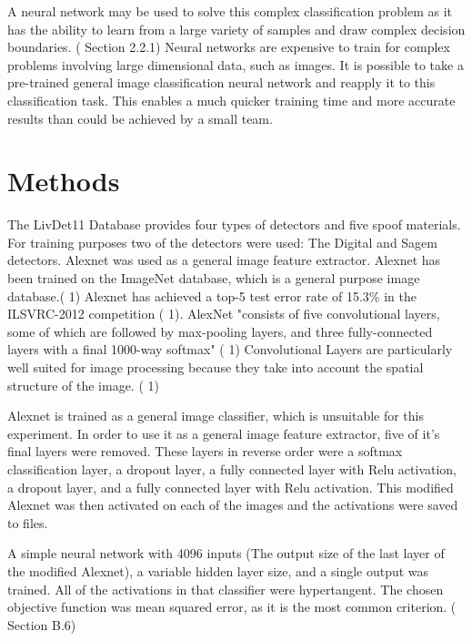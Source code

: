 \documentclass[]{article}
\begin{document}
A neural network may be used to solve this complex classification problem as it has the ability to learn from a large variety of samples and draw complex decision boundaries. (\cite{book} Section 2.2.1)  Neural networks are expensive to train for complex problems involving large dimensional data, such as images. It is possible to take a pre-trained general image classification neural network and reapply it to this classification task. This enables a much quicker training time and more accurate results than could be achieved by a small team. 

\section{Methods}
The LivDet11 Database provides four types of detectors and five spoof materials. For training purposes two of the detectors were used: The Digital and Sagem detectors. Alexnet was used as a general image feature extractor. Alexnet has been trained on the ImageNet database, which is a general purpose image database.(\cite{alexnet} 1) Alexnet has achieved a  top-5 test error rate of 15.3\% in the ILSVRC-2012 competition (\cite{alexnet} 1). AlexNet "consists
of five convolutional layers, some of which are followed by max-pooling layers,
and three fully-connected layers with a final 1000-way softmax" (\cite{alexnet} 1) Convolutional Layers are particularly well suited for image processing because they take into account the spatial structure of the image. (\cite{convnets} 1)

Alexnet is trained as a general image classifier, which is unsuitable for this experiment.  In order to use it as a general image feature extractor, five of it's final layers were removed. These layers in reverse order were a softmax classification layer, a dropout layer, a fully connected layer with Relu activation, a dropout layer, and a fully connected layer with Relu activation. This modified Alexnet was then activated on each of the images and the activations were saved to files. 
 
A simple neural network with 4096 inputs (The output size of the last layer of the modified Alexnet), a variable hidden layer size, and a single output was trained. All of the activations in that classifier were hypertangent. The chosen objective function was mean squared error, as it is the most common criterion. (\cite{book} Section B.6)
\end{document}
